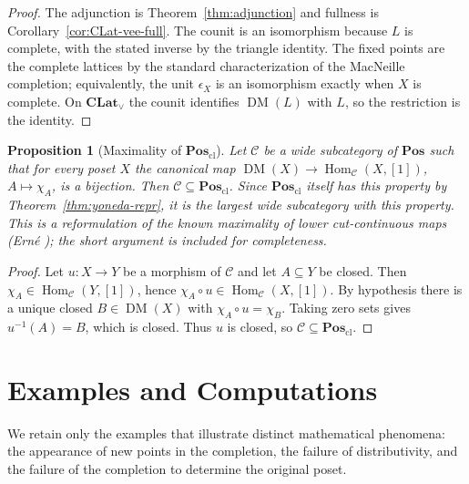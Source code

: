 \documentclass{amsart}
\theoremstyle{plain}
\newtheorem{proposition}{Proposition}[section]
\theoremstyle{definition}
\theoremstyle{remark}
\DeclareMathOperator{\DM}{DM}
\DeclareMathOperator{\Hom}{Hom}
\begin{document}
\begin{proof}
The adjunction is Theorem~\ref{thm:adjunction} and fullness is Corollary~\ref{cor:CLat-vee-full}. The counit is an isomorphism because $L$ is complete, with the stated inverse by the triangle identity. The fixed points are the complete lattices by the standard characterization of the MacNeille completion; equivalently, the unit $\epsilon_X$ is an isomorphism exactly when $X$ is complete. On $\mathbf{CLat}_\vee$ the counit identifies $\DM(L)$ with $L$, so the restriction is the identity.
\end{proof}

\begin{proposition}[Maximality of $\mathbf{Pos}_{\mathrm{cl}}$]\label{obs:pos-cl-maximal}
Let $\mathcal{C}$ be a wide subcategory of $\mathbf{Pos}$ such that for every poset $X$ the canonical map $\DM(X)\to\Hom_{\mathcal{C}}(X,[1])$, $A\mapsto\chi_A$, is a bijection. Then $\mathcal{C}\subseteq\mathbf{Pos}_{\mathrm{cl}}$. Since $\mathbf{Pos}_{\mathrm{cl}}$ itself has this property by Theorem~\ref{thm:yoneda-repr}, it is the largest wide subcategory with this property. This is a reformulation of the known maximality of lower cut-continuous maps (Ern\'e \cite{erne1991dedekind}); the short argument is included for completeness.
\end{proposition}

\begin{proof}
Let $u\colon X\to Y$ be a morphism of $\mathcal{C}$ and let $A\subseteq Y$ be closed. Then $\chi_A\in\Hom_{\mathcal{C}}(Y,[1])$, hence $\chi_A\circ u\in\Hom_{\mathcal{C}}(X,[1])$. By hypothesis there is a unique closed $B\in\DM(X)$ with $\chi_A\circ u=\chi_B$. Taking zero sets gives $u^{-1}(A)=B$, which is closed. Thus $u$ is closed, so $\mathcal{C}\subseteq\mathbf{Pos}_{\mathrm{cl}}$.
\end{proof}


\section{Examples and Computations}\label{sec:examples}

We retain only the examples that illustrate distinct mathematical phenomena: the appearance of new points in the completion, the failure of distributivity, and the failure of the completion to determine the original poset.
\end{document}
